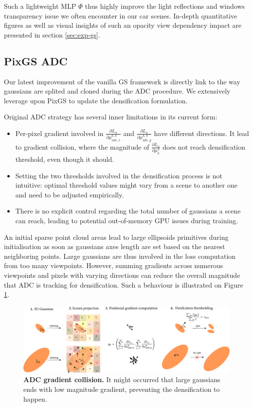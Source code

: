 Such a lightweight \ac{MLP} $\Phi$ thus highly improve the light reflections and windows transparency issue we often encounter in our car scenes. In-depth quantitative figures as well as visual insights of such an opacity view dependency impact are presented in section \ref{sec:exp-gs}. 

\subsection{PixGS ADC}
\label{gs:pixgs-adc}
Our latest improvement of the vanilla GS framework is directly link to the way gaussians are splited and cloned during the \ac{ADC} procedure. We extensively leverage upon PixGS \citep{zhang2024pixelgs} to update the densification formulation.  

Original \ac{ADC} strategy has several inner limitations in its current form: 
\begin{itemize}
    \item Per-pixel gradient involved in $\frac{\partial L_{\pi}}{\partial \mu^{k,\pi}_{ndc,x}}$ and $\frac{\partial L_{\pi}}{\partial \mu^{k,\pi}_{ndc,y}}$  have different directions. It lead to gradient collision, where the magnitude of $\frac{\partial L_{\pi}}{\partial \mu_{k}^{\pi}}$ does not reach densification threshold, even though it should. 
    \item Setting the two thresholds involved in the densification process is not intuitive: optimal threshold values might vary from a scene to another one and need to be adjusted empirically.
    \item There is no explicit control regarding the total number of gaussians a scene can reach, leading to potential out-of-memory \ac{GPU} issues during training.
\end{itemize}

An initial sparse point cloud areas lead to large ellipsoids primitives during initialisation as soon as gaussians axes length are set based on the nearest neighboring points. Large gaussians are thus involved in the loss computation from too many viewpoints. However, summing gradients across numerous viewpoints and pixels with varying directions can reduce the overall magnitude that \ac{ADC} is tracking for densification. Such a behaviour is illustrated on Figure \ref{fig:adc-limitation}. 

\begin{figure}[htbp!]
    \center
  \includegraphics[width=\linewidth]{images/gaussiansplatting/adc_limitation.png}
  \caption{\textbf{ADC gradient collision.} It might occurred that large gaussians ends with low magnitude gradient, preventing the densification to happen.}
  \label{fig:adc-limitation}
\end{figure}



